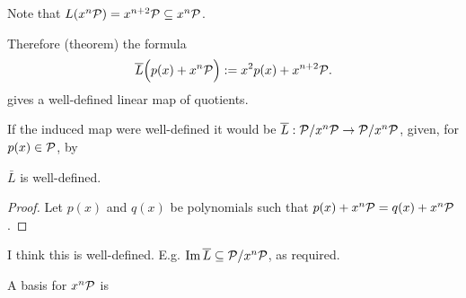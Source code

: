 \documentclass[12pt]{article}
\begin{document}
Note that $L(x^n\mathcal P) = x^{n+2}\mathcal P \subseteq x^n\mathcal P$.

Therefore (theorem) the formula
\begin{align*}
  \overline L\Big(p(x) + x^n\mathcal P\Big) := x^2p(x) + x^{n+2}\mathcal P.
\end{align*}
gives a well-defined linear map of quotients.

If the induced map were well-defined it would be $\overline L:\mathcal P/x^n\mathcal P \to \mathcal P/x^n\mathcal P$, given,
for $p(x) \in \mathcal P$, by

\begin{claim*}
  $\bar L$ is well-defined.
\end{claim*}

\begin{proof}
  Let $p(x)$ and $q(x)$ be polynomials such that $p(x) + x^n\mathcal P = q(x) + x^n\mathcal P$.
\end{proof}

I think this is well-defined. E.g. $\operatorname{\mathrm{Im}} \overline L \subseteq \mathcal P/x^n\mathcal P$, as required.

A basis for $x^n\mathcal P$ is

\end{document}
